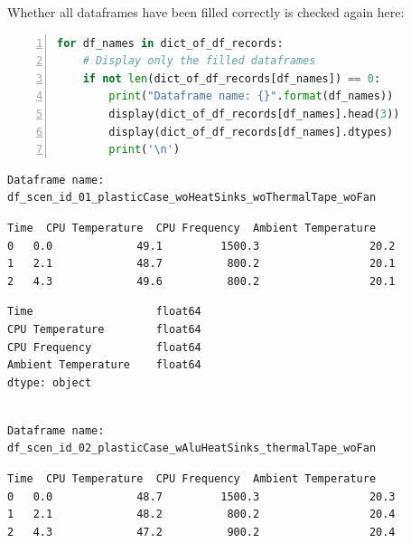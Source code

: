 \documentclass[10pt,parskip=half,
toc=sectionentrywithdots,
bibliography=totocnumbered,
captions=tableheading,numbers=noendperiod]{scrartcl}
\begin{document}
Whether all dataframes have been filled correctly is checked again here:

\begin{lstlisting}[language=Python,numbers=left,xleftmargin=20pt,xrightmargin=5pt,belowskip=5pt,aboveskip=5pt]
for df_names in dict_of_df_records:
    # Display only the filled dataframes
    if not len(dict_of_df_records[df_names]) == 0:
        print("Dataframe name: {}".format(df_names))
        display(dict_of_df_records[df_names].head(3))
        display(dict_of_df_records[df_names].dtypes)
        print('\n')
\end{lstlisting}

\begin{lstlisting}[language={},postbreak={},numbers=none,xrightmargin=7pt,belowskip=5pt,aboveskip=5pt,breakindent=0pt]
Dataframe name: df_scen_id_01_plasticCase_woHeatSinks_woThermalTape_woFan

\end{lstlisting}

\begin{lstlisting}[language={},postbreak={},numbers=none,xrightmargin=7pt,breakindent=0pt,aboveskip=5pt,belowskip=5pt]
   Time  CPU Temperature  CPU Frequency  Ambient Temperature
0   0.0             49.1         1500.3                 20.2
1   2.1             48.7          800.2                 20.1
2   4.3             49.6          800.2                 20.1
\end{lstlisting}

\begin{lstlisting}[language={},postbreak={},numbers=none,xrightmargin=7pt,breakindent=0pt,aboveskip=5pt,belowskip=5pt]
Time                   float64
CPU Temperature        float64
CPU Frequency          float64
Ambient Temperature    float64
dtype: object
\end{lstlisting}

\begin{lstlisting}[language={},postbreak={},numbers=none,xrightmargin=7pt,belowskip=5pt,aboveskip=5pt,breakindent=0pt]

Dataframe name: df_scen_id_02_plasticCase_wAluHeatSinks_thermalTape_woFan

\end{lstlisting}

\begin{lstlisting}[language={},postbreak={},numbers=none,xrightmargin=7pt,breakindent=0pt,aboveskip=5pt,belowskip=5pt]
   Time  CPU Temperature  CPU Frequency  Ambient Temperature
0   0.0             48.7         1500.3                 20.3
1   2.1             48.2          800.2                 20.4
2   4.3             47.2          900.2                 20.4
\end{lstlisting}
\end{document}
